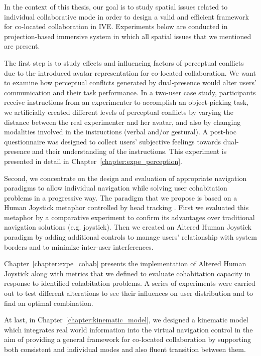 In the context of this thesis, our goal is to study spatial issues related to individual collaborative mode in order to design a valid and efficient framework for co-located collaboration in IVE. Experiments below are conducted in projection-based immersive system in which all spatial issues that we mentioned are present.

The first step is to study effects and influencing factors of perceptual conflicts due to the introduced avatar representation for co-located collaboration. We want to examine how perceptual conflicts generated by dual-presence would alter users' communication and their task performance. In a two-user case study, participants receive instructions from an experimenter to accomplish an object-picking task, we artificially created different levels of perceptual conflicts by varying the distance between the real experimenter and her avatar, and also by changing modalities involved in the instructions (verbal and/or gestural). A post-hoc questionnaire was designed to collect users' subjective feelings towards dual-presence and their understanding of the instructions. This experiment is presented in detail in Chapter~\ref{chapter:expe_perception}.

Second, we concentrate on the design and evaluation of appropriate navigation paradigms to allow individual navigation while solving user cohabitation problems in a progressive way. The paradigm that we propose is based on a Human Joystick metaphor controlled by head tracking \citep{Bourdot2002HCNav}. First we evaluated this metaphor by a comparative experiment \citep{Chen2013NVW} to confirm its advantages over traditional navigation solutions (e.g. joystick). Then we created an Altered Human Joystick paradigm by adding additional controls to manage users' relationship with system borders and to minimize inter-user interferences.

Chapter~\ref{chapter:expe_cohab} presents the implementation of Altered Human Joystick along with metrics that we defined to evaluate cohabitation capacity in response to identified cohabitation problems. A series of experiments were carried out to test different alterations to see their influences on user distribution and to find an optimal combination.

At last, in Chapter~\ref{chapter:kinematic_model}, we designed a kinematic model which integrates real world information into the virtual navigation control in the aim of providing a general framework for co-located collaboration by supporting both consistent and individual modes and also fluent transition between them.


